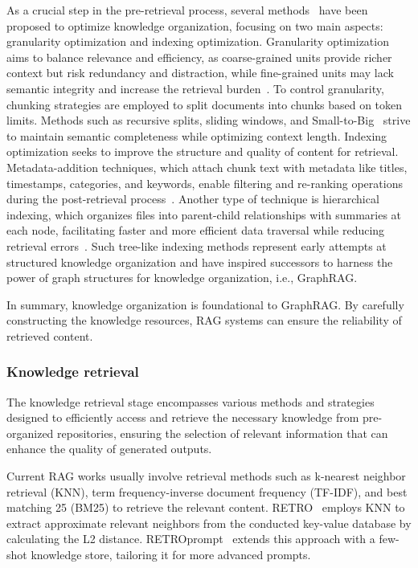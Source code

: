\documentclass[lettersize,journal]{IEEEtran}
\begin{document}
As a crucial step in the pre-retrieval process, several methods~\cite{gao2023retrieval,wang2024searchingforbestpractivesinrag} have been proposed to optimize knowledge organization, focusing on two main aspects: granularity optimization and indexing optimization. Granularity optimization aims to balance relevance and efficiency, as coarse-grained units provide richer context but risk redundancy and distraction, while fine-grained units may lack semantic integrity and increase the retrieval burden~\cite{yu2023chain,zhong2024mixofgranularity}. To control granularity, chunking strategies are employed to split documents into chunks based on token limits. Methods such as recursive splits, sliding windows, and Small-to-Big~\cite{wang2024searchingforbestpractivesinrag,llamaindex_website} strive to maintain semantic completeness while optimizing context length. Indexing optimization seeks to improve the structure and quality of content for retrieval. Metadata-addition techniques, which attach chunk text with metadata like titles, timestamps, categories, and keywords, enable filtering and re-ranking operations during the post-retrieval process~\cite{wang2024searchingforbestpractivesinrag}. Another type of technique is hierarchical indexing, which organizes files into parent-child relationships with summaries at each node, facilitating faster and more efficient data traversal while reducing retrieval errors~\cite{wang2024corag}. Such tree-like indexing methods represent early attempts at structured knowledge organization and have inspired successors to harness the power of graph structures for knowledge organization, i.e., GraphRAG.

In summary, knowledge organization is foundational to GraphRAG. By carefully constructing the knowledge resources, RAG systems can ensure the reliability of retrieved content.


\subsubsection{Knowledge retrieval}
The knowledge retrieval stage encompasses various methods and strategies designed to efficiently access and retrieve the necessary knowledge from pre-organized repositories, ensuring the selection of relevant information that can enhance the quality of generated outputs.

Current RAG works usually involve retrieval methods such as k-nearest neighbor retrieval (KNN), term frequency-inverse document frequency (TF-IDF), and best matching 25 (BM25) to retrieve the relevant content.
RETRO~\cite{borgeaud2022improving} employs KNN to extract approximate relevant neighbors from the conducted key-value database by calculating the L2 distance. RETROprompt~\cite{chen2022decoupling} extends this approach with a few-shot knowledge store, tailoring it for more advanced prompts.
\end{document}
